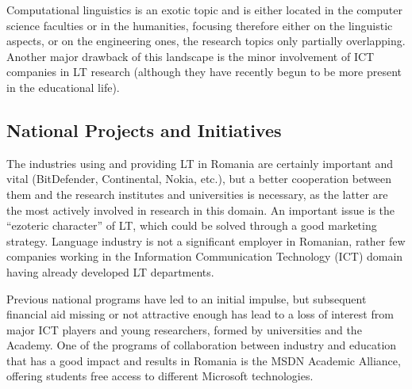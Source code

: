 \begin{multicols}{2}
Computational linguistics is an exotic topic and is either located in the computer science faculties or in the humanities, focusing therefore either on the linguistic aspects, or on the engineering ones, the research topics only partially overlapping. Another major drawback of this landscape is the minor involvement of ICT companies in LT research (although they have recently begun to be more present in the educational life).

\subsection{National Projects and Initiatives}

The industries using and providing LT in Romania are certainly important and vital (BitDefender, Continental, Nokia, etc.), but a better cooperation between them and the research institutes and universities is necessary, as the latter are the most actively involved in research in this domain. An important issue is the ``ezoteric character'' of LT, which could be solved through a good marketing strategy. Language industry is not a significant employer in Romanian, rather few companies working in the Information Communication Technology (ICT) domain having already developed LT departments.

Previous national programs have led to an initial impulse, but subsequent financial aid missing or not attractive enough has lead to a loss of interest from major ICT players and young researchers, formed by universities and the Academy. One of the programs of collaboration between industry and education that has a good impact and results in Romania is the MSDN Academic Alliance, offering students free access to different Microsoft technologies. 


\end{multicols}
